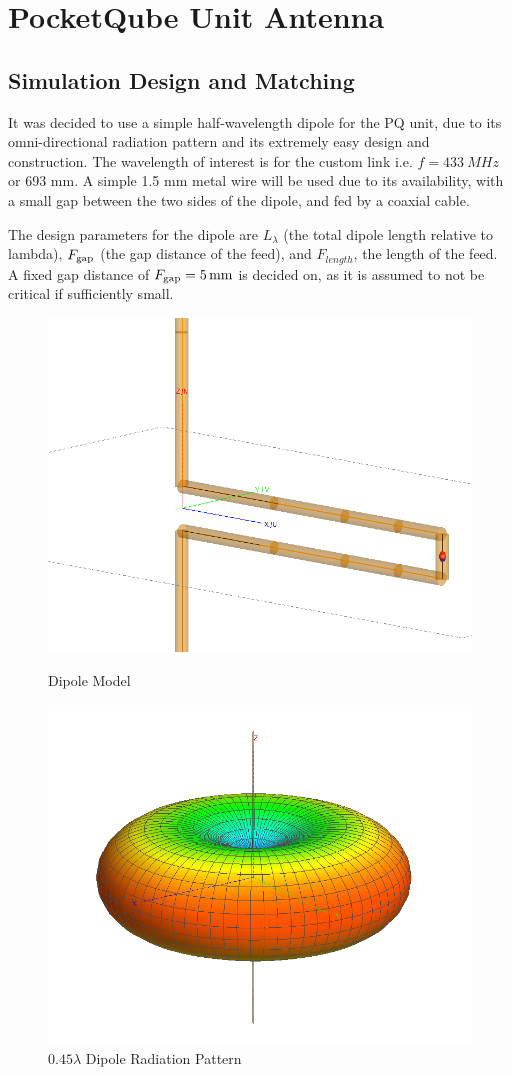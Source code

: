 \graphicspath{{./figures}}

\section{PocketQube Unit Antenna}
\subsection{Simulation Design and Matching}
It was decided to use a simple half-wavelength dipole for the PQ unit, due to its omni-directional radiation pattern and its extremely easy design and construction. The wavelength of interest is for the custom link i.e. $f = \SI{433}{MHz}$ or 693 mm. A simple 1.5 mm metal wire will be used due to its availability, with a small gap between the two sides of the dipole, and fed by a coaxial cable.

The design parameters for the dipole are $L_\lambda$ (the total dipole length relative to lambda), $F_{\textnormal{gap}}$ (the gap distance of the feed), and $F_{length}$, the length of the feed. A fixed gap distance of $F_{\textnormal{gap}} = \SI{5}{mm}$ is decided on, as it is assumed to not be critical if sufficiently small.

\begin{figure}[!htb]
  \begin{minipage}{.49\textwidth}
    \centering
    \includegraphics[width=0.65\linewidth]{dipole1_modelMesh}
    \caption{Dipole Model}
    \label{fig:dipole1_modelMesh}
  \end{minipage}
  \begin{minipage}{.49\textwidth}
    \centering
    \includegraphics[width=0.65\linewidth]{dipole1_pattern_433MHz}
    \caption{$0.45 \lambda$ Dipole Radiation Pattern}
    \label{fig:dipole1_pattern_433MHz}
  \end{minipage}
\end{figure}

